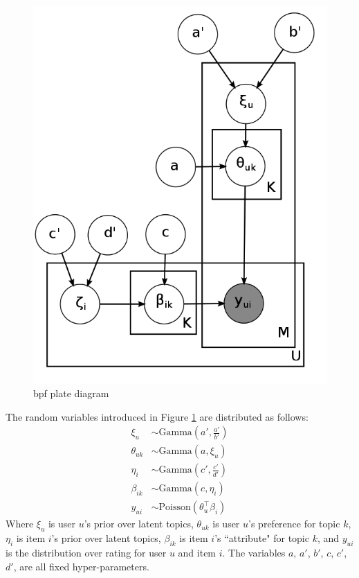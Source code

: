\documentclass{article} %
\begin{document}
\begin{figure}[h]
\begin{center}
	\includegraphics[scale=0.25]{bpf.png}
\end{center}
\caption{\acrlong{bpf} plate diagram}
\label{fig:bpf-model}
\end{figure}

The random variables introduced in Figure \ref{fig:bpf-model} are distributed as follows:
\begin{align*}
	\xi_u &\sim \mathrm{Gamma}\left( a', \frac{a'}{b'} \right) \\
	\theta_{uk} &\sim \mathrm{Gamma}\left( a, \xi_u \right) \\
	\eta_i &\sim \mathrm{Gamma}\left( c', \frac{c'}{d'} \right) \\
	\beta_{ik} &\sim \mathrm{Gamma}\left( c, \eta_i \right) \\
	y_{ui} &\sim \mathrm{Poisson}\left( \theta^\top_u \beta_i \right )
\end{align*}
Where $\xi_u$ is user $u$'s prior over latent topics, $\theta_{uk}$ is user $u$'s preference for topic $k$, $\eta_i$ is item $i$'s prior over latent topics, $\beta_{ik}$ is item $i$'s ``attribute" for topic $k$, and $y_{ui}$ is the distribution over rating for user $u$ and item $i$. The variables $a$, $a'$, $b'$, $c$, $c'$, $d'$, are all fixed hyper-parameters. 
\end{document}
